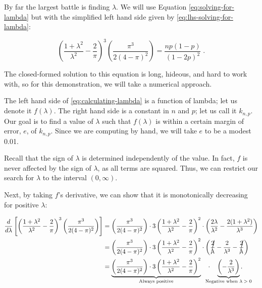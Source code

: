 \documentclass{article}
\begin{document}
By far the largest battle is finding $\lambda$. We will use Equation
\eqref{eq:solving-for-lambda} but with the simplified left hand side given by
\eqref{eq:lhs-solving-for-lambda}:

\begin{equation}
  \label{eq:calculating-lambda}
  \left( \frac{1+\lambda^2}{\lambda^2} - \frac{2}{\pi} \right)^3 \left( \frac{\pi^3}{2(4-\pi)^2} \right) = \frac{np(1-p)}{(1-2p)^2} \;.
\end{equation}

The closed-formed solution to this equation is long, hideous, and hard to work
with, so for this demonstration, we will take a numerical approach.

The left hand side of \eqref{eq:calculating-lambda} is a function of lambda;
let us denote it $f(\lambda)$. The right hand side is a constant in $n$ and
$p$; let us call it $k_{n,p}$. Our goal is to find a value of $\lambda$ such
that $f(\lambda)$ is within a certain margin of error, $e$, of $k_{n,p}$. Since
we are computing by hand, we will take $e$ to be a modest 0.01.

Recall that the sign of $\lambda$ is determined independently of the value. In
fact, $f$ is never affected by the sign of $\lambda$, as all terms are squared.
Thus, we can restrict our search for $\lambda$ to the interval $(0, \infty)$.

Next, by taking $f$'s derivative, we can show that it is monotonically
decreasing for positive $\lambda$:

\begin{align*}
  \frac{d}{d\lambda} \left[ \left( \frac{1+\lambda^2}{\lambda^2} - \frac{2}{\pi} \right)^3 \left( \frac{\pi^3}{2(4-\pi)^2} \right) \right] &= \left( \frac{\pi^3}{2(4-\pi)^2} \right) \cdot
    3 \left( \frac{1+\lambda^2}{\lambda^2} - \frac{2}{\pi} \right)^2 \cdot \left( \frac{2\lambda}{\lambda^2} - \frac{2(1+\lambda^2)}{\lambda^3} \right) \\
  &= \left( \frac{\pi^3}{2(4-\pi)^2} \right) \cdot 3 \left( \frac{1+\lambda^2}{\lambda^2} - \frac{2}{\pi} \right)^2 \cdot
    \left( \cancel{\frac{2}{\lambda}} - \frac{2}{\lambda^3} - \cancel{\frac{2}{\lambda}} \right) \\
  &= \underbrace{\left( \frac{\pi^3}{2(4-\pi)^2} \right) \cdot 3 \left( \frac{1+\lambda^2}{\lambda^2} - \frac{2}{\pi} \right)^2}_\textnormal{Always positive} \quad \cdot \quad
     \underbrace{\left( -\frac{2}{\lambda^3} \right)}_{\mathclap{\textnormal{Negative when $\lambda > 0$}}}.
\end{align*}
\end{document}
